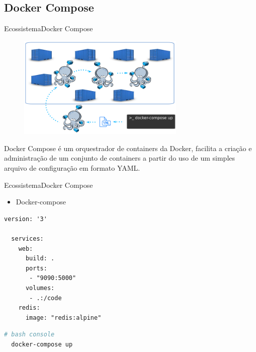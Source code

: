 \subsection{Docker Compose}
\begin{frame}{Ecossistema}{Docker Compose}
  \begin{figure}[ht!]
    \centering
    \includegraphics[width=80mm]{images/docker_compose}
  \end{figure}
  Docker Compose é um orquestrador de containers da Docker, facilita a criação e administração de um conjunto de containers a partir do uso de um simples arquivo de configuração em formato YAML.
\end{frame}

\begin{frame}[fragile]{Ecossistema}{Docker Compose}
  \begin{itemize}
    \item<1-> Docker-compose
  \end{itemize}
  \begin{lstlisting}[language=docker]
  version: '3'

  services:
    web:
      build: .
      ports:
       - "9090:5000"
      volumes:
       - .:/code
    redis:
      image: "redis:alpine"
  \end{lstlisting}
  \begin{lstlisting}[language=bash]
  # bash console
  docker-compose up
  \end{lstlisting}
\end{frame}
